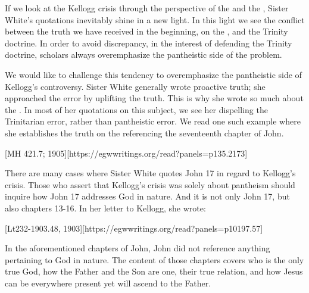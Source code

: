 
If we look at the Kellogg crisis through the perspective of the  and the , Sister White’s quotations inevitably shine in a new light. In this light we see the conflict between the truth we have received in the beginning, on the , and the Trinity doctrine. In order to avoid discrepancy, in the interest of defending the Trinity doctrine, scholars always overemphasize the pantheistic side of the problem.

We would like to challenge this tendency to overemphasize the pantheistic side of Kellogg’s controversy. Sister White generally wrote proactive truth; she approached the error by uplifting the truth. This is why she wrote so much about the . In most of her quotations on this subject, we see her dispelling the Trinitarian error, rather than pantheistic error. We read one such example where she establishes the truth on the  referencing the seventeenth chapter of John.

[MH 421.7; 1905][https://egwwritings.org/read?panels=p135.2173]

There are many cases where Sister White quotes John 17 in regard to Kellogg’s crisis. Those who assert that Kellogg’s crisis was solely about pantheism should inquire how John 17 addresses God in nature. And it is not only John 17, but also chapters 13-16. In her letter to Kellogg, she wrote:

[Lt232-1903.48, 1903][https://egwwritings.org/read?panels=p10197.57]

In the aforementioned chapters of John, John did not reference anything pertaining to God in nature. The content of those chapters covers who is the only true God, how the Father and the Son are one, their true relation, and how Jesus can be everywhere present yet will ascend to the Father.

